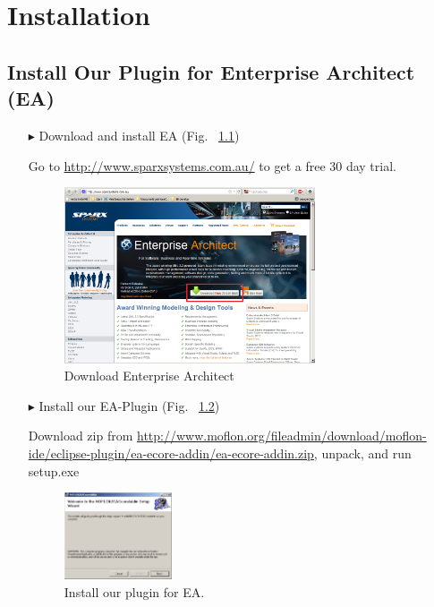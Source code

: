 \chapter{Installation}
\label{chap:installation}

\section{Install Our Plugin for Enterprise Architect (EA)}
\begin{enumerate}
\item[$\blacktriangleright$] Download and install EA (Fig.~
\ref{fig_enterpriseArchitextHomepage}) 
\item[] Go to \url{http://www.sparxsystems.com.au/} to get a free 30 day trial.
\begin{figure}[!h]
	\centering
  \includegraphics[width=0.7\textwidth]{pics/ea_download.png}
	\caption{Download Enterprise Architect}
	\label{fig_enterpriseArchitextHomepage}
\end{figure} 
\item[$\blacktriangleright$] Install our EA-Plugin (Fig.~
\ref{fig_eaPluginWizard})
\item[] Download zip from
\url{http://www.moflon.org/fileadmin/download/moflon-ide/eclipse-plugin/ea-ecore-addin/ea-ecore-addin.zip},
unpack, and run setup.exe
\begin{figure}[!h]
	\centering
  \includegraphics[width=0.3\textwidth]{pics/eaplugin_install.png}
	\caption{Install our plugin for EA.}
	\label{fig_eaPluginWizard}
\end{figure}
\end{enumerate}

